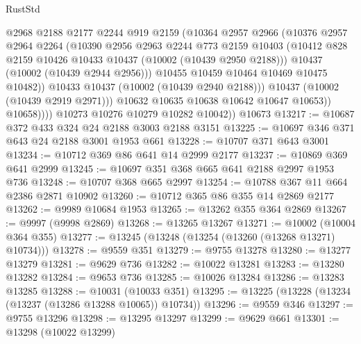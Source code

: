 \begin{lexlean}{RustStd}
\begin{coremodule}
                        @2968
                        @2188
                        @2177
                        @2244
                        @919
                        @2159
                        (@10364
                          @2957
                          @2966
                          (@10376
                            @2957
                            @2964
                            @2264
                            (@10390
                              @2956
                              @2963
                              @2244
                              @773
                              @2159
                              @10403
                              (@10412 @828 @2159 @10426 @10433 @10437 (@10002 (@10439 @2950 @2188)))
                              @10437
                              (@10002 (@10439 @2944 @2956)))
                            @10455
                            @10459
                            @10464
                            @10469
                            @10475
                            @10482))
                        @10433
                        @10437
                        (@10002 (@10439 @2940 @2188)))
                      @10437
                      (@10002 (@10439 @2919 @2971)))
                    @10632
                    @10635
                    @10638
                    @10642
                    @10647
                    @10653))
                @10658))))
        @10273
        @10276
        @10279
        @10282
        @10042))
    @10673
@13217 := @10687 @372 @433 @324 @24 @2188 @3003 @2188 @3151
@13225 := @10697 @346 @371 @643 @24 @2188 @3001 @1953 @661
@13228 := @10707 @371 @643 @3001
@13234 := @10712 @369 @86 @641 @14 @2999 @2177
@13237 := @10869 @369 @641 @2999
@13245 := @10697 @351 @368 @665 @641 @2188 @2997 @1953 @736
@13248 := @10707 @368 @665 @2997
@13254 := @10788 @367 @11 @664 @2386 @2871 @10902
@13260 := @10712 @365 @86 @355 @14 @2869 @2177
@13262 := @9989 @10684 @1953
@13265 := @13262 @355 @364 @2869
@13267 := @9997 (@9998 @2869)
@13268 := @13265 @13267
@13271 := @10002 (@10004 @364 @355)
@13277 := @13245 (@13248 (@13254 (@13260 (@13268 @13271) @10734)))
@13278 := @9559 @351
@13279 := @9755 @13278
@13280 := @13277 @13279
@13281 := @9629 @736
@13282 := @10022 @13281
@13283 := @13280 @13282
@13284 := @9653 @736
@13285 := @10026 @13284
@13286 := @13283 @13285
@13288 := @10031 (@10033 @351)
@13295 := @13225 (@13228 (@13234 (@13237 (@13286 @13288 @10065)) @10734))
@13296 := @9559 @346
@13297 := @9755 @13296
@13298 := @13295 @13297
@13299 := @9629 @661
@13301 := @13298 (@10022 @13299)

\end{coremodule}
\end{lexlean}
